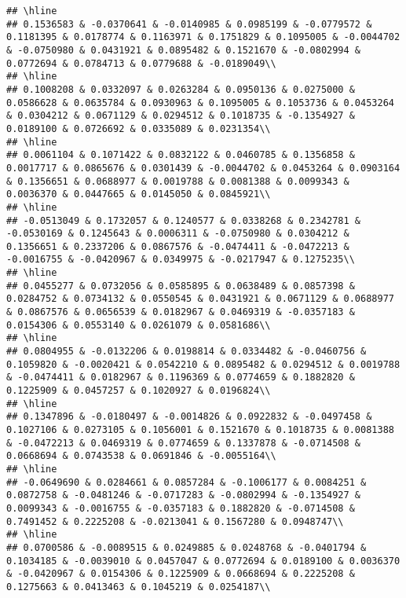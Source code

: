 \documentclass[]{article}
\begin{document}
\begin{verbatim}
## \hline
## 0.1536583 & -0.0370641 & -0.0140985 & 0.0985199 & -0.0779572 & 0.1181395 & 0.0178774 & 0.1163971 & 0.1751829 & 0.1095005 & -0.0044702 & -0.0750980 & 0.0431921 & 0.0895482 & 0.1521670 & -0.0802994 & 0.0772694 & 0.0784713 & 0.0779688 & -0.0189049\\
## \hline
## 0.1008208 & 0.0332097 & 0.0263284 & 0.0950136 & 0.0275000 & 0.0586628 & 0.0635784 & 0.0930963 & 0.1095005 & 0.1053736 & 0.0453264 & 0.0304212 & 0.0671129 & 0.0294512 & 0.1018735 & -0.1354927 & 0.0189100 & 0.0726692 & 0.0335089 & 0.0231354\\
## \hline
## 0.0061104 & 0.1071422 & 0.0832122 & 0.0460785 & 0.1356858 & 0.0017717 & 0.0865676 & 0.0301439 & -0.0044702 & 0.0453264 & 0.0903164 & 0.1356651 & 0.0688977 & 0.0019788 & 0.0081388 & 0.0099343 & 0.0036370 & 0.0447665 & 0.0145050 & 0.0845921\\
## \hline
## -0.0513049 & 0.1732057 & 0.1240577 & 0.0338268 & 0.2342781 & -0.0530169 & 0.1245643 & 0.0006311 & -0.0750980 & 0.0304212 & 0.1356651 & 0.2337206 & 0.0867576 & -0.0474411 & -0.0472213 & -0.0016755 & -0.0420967 & 0.0349975 & -0.0217947 & 0.1275235\\
## \hline
## 0.0455277 & 0.0732056 & 0.0585895 & 0.0638489 & 0.0857398 & 0.0284752 & 0.0734132 & 0.0550545 & 0.0431921 & 0.0671129 & 0.0688977 & 0.0867576 & 0.0656539 & 0.0182967 & 0.0469319 & -0.0357183 & 0.0154306 & 0.0553140 & 0.0261079 & 0.0581686\\
## \hline
## 0.0804955 & -0.0132206 & 0.0198814 & 0.0334482 & -0.0460756 & 0.1059820 & -0.0020421 & 0.0542210 & 0.0895482 & 0.0294512 & 0.0019788 & -0.0474411 & 0.0182967 & 0.1196369 & 0.0774659 & 0.1882820 & 0.1225909 & 0.0457257 & 0.1020927 & 0.0196824\\
## \hline
## 0.1347896 & -0.0180497 & -0.0014826 & 0.0922832 & -0.0497458 & 0.1027106 & 0.0273105 & 0.1056001 & 0.1521670 & 0.1018735 & 0.0081388 & -0.0472213 & 0.0469319 & 0.0774659 & 0.1337878 & -0.0714508 & 0.0668694 & 0.0743538 & 0.0691846 & -0.0055164\\
## \hline
## -0.0649690 & 0.0284661 & 0.0857284 & -0.1006177 & 0.0084251 & 0.0872758 & -0.0481246 & -0.0717283 & -0.0802994 & -0.1354927 & 0.0099343 & -0.0016755 & -0.0357183 & 0.1882820 & -0.0714508 & 0.7491452 & 0.2225208 & -0.0213041 & 0.1567280 & 0.0948747\\
## \hline
## 0.0700586 & -0.0089515 & 0.0249885 & 0.0248768 & -0.0401794 & 0.1034185 & -0.0039010 & 0.0457047 & 0.0772694 & 0.0189100 & 0.0036370 & -0.0420967 & 0.0154306 & 0.1225909 & 0.0668694 & 0.2225208 & 0.1275663 & 0.0413463 & 0.1045219 & 0.0254187\\

\end{verbatim}
\end{document}
